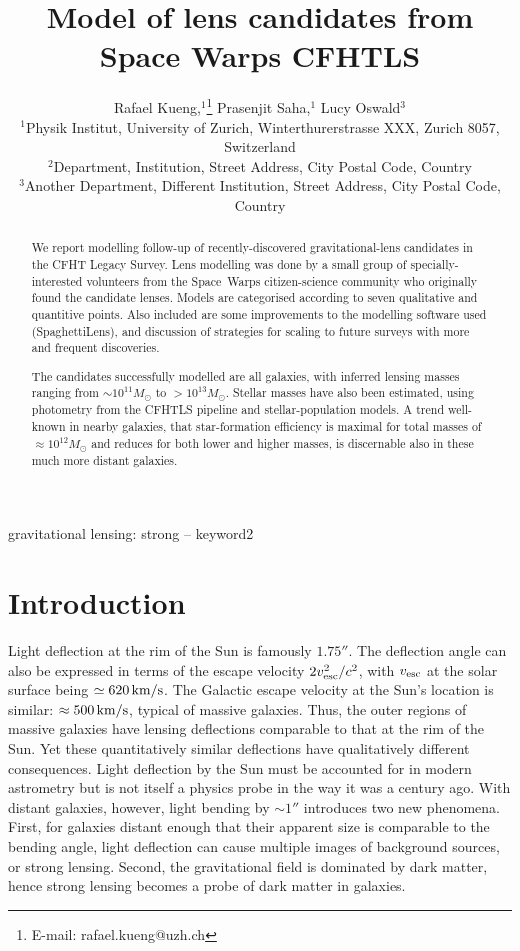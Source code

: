 \documentclass[fleqn,usenatbib]{mnras}
\title[Short title, max. 45 characters]{Model of lens candidates from
  Space Warps CFHTLS}
\author[R. Kueng et al.]{
Rafael Kueng,$^{1}$\thanks{E-mail: rafael.kueng@uzh.ch}
Prasenjit Saha,$^{1}$
Lucy Oswald$^{3}$
\\
$^{1}$Physik Institut, University of Zurich, Winterthurerstrasse XXX, Zurich 8057, Switzerland\\
$^{2}$Department, Institution, Street Address, City Postal Code, Country\\
$^{3}$Another Department, Different Institution, Street Address, City Postal Code, Country
}
\begin{document}
\label{firstpage}
\pagerange{\pageref{firstpage}--\pageref{lastpage}}
\maketitle

\begin{abstract}
We report modelling follow-up of recently-discovered
gravitational-lens candidates in the CFHT Legacy Survey.  Lens
modelling was done by a small group of specially-interested volunteers
from the Space~Warps citizen-science community who originally found
the candidate lenses.  Models are categorised according to seven
qualitative and quantitive points.  Also included are some
improvements to the modelling software used (SpaghettiLens),
and discussion of strategies for scaling to future surveys
with more and frequent discoveries.

The candidates successfully modelled are all galaxies, with inferred
lensing masses ranging from $\sim10^{11}M_\odot$ to $>10^{13}M_\odot$.
Stellar masses have also been estimated, using photometry from the
CFHTLS pipeline and stellar-population models.  A trend well-known
in nearby galaxies, that star-formation efficiency is maximal for
total masses of $\approx10^{12}M_\odot$ and reduces for both lower and
higher masses, is discernable also in these much more distant
galaxies.
\end{abstract}

\begin{keywords}
gravitational lensing: strong -- keyword2
\end{keywords}

\section{Introduction}

Light deflection at the rim of the Sun is famously $1.75''$.  The
deflection angle can also be expressed in terms of the escape velocity
$2v_{\rm esc}^2/c^2$, with $v_{\rm esc}$ at the solar surface being
$\simeq620\rm\,km/s$.  The Galactic escape velocity at the Sun's
location is similar: $\approx500\rm\,km/s$, typical of massive
galaxies.  Thus, the outer regions of massive galaxies have lensing
deflections comparable to that at the rim of the Sun.  Yet these
quantitatively similar deflections have qualitatively different
consequences.  Light deflection by the Sun must be accounted for in
modern astrometry \citep[see e.g.,][]{2015CQGra..32p5008C} but is not
itself a physics probe in the way it was a century ago.  With distant
galaxies, however, light bending by $\sim1''$ introduces two new
phenomena.  First, for galaxies distant enough that their apparent
size is comparable to the bending angle, light deflection can cause
multiple images of background sources, or strong lensing.  Second, the
gravitational field is dominated by dark matter, hence strong lensing
becomes a probe of dark matter in galaxies.
\end{document}
